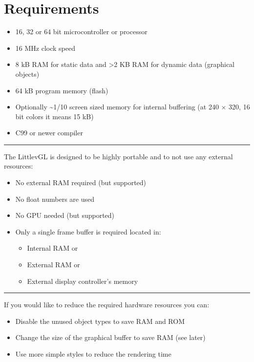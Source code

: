 \documentclass[letterpaper,10pt,english]{sphinxmanual}
\begin{document}
\section{Requirements}
\label{\detokenize{intro:requirements}}\begin{itemize}
\item {} 
16, 32 or 64 bit microcontroller or processor

\item {} 
16 MHz clock speed

\item {} 
8 kB RAM for static data and \textgreater{}2 KB RAM for dynamic data (graphical objects)

\item {} 
64 kB program memory (flash)

\item {} 
Optionally \textasciitilde{}1/10 screen sized memory for internal buffering (at 240 × 320, 16 bit colors it means 15 kB)

\item {} 
C99 or newer compiler

\end{itemize}


\bigskip\hrule\bigskip


The LittlevGL is designed to be highly portable and to not use any external resources:
\begin{itemize}
\item {} 
No external RAM required (but supported)

\item {} 
No float numbers are used

\item {} 
No GPU needed (but supported)

\item {} 
Only a single frame buffer is required located in:
\begin{itemize}
\item {} 
Internal RAM or

\item {} 
External RAM or

\item {} 
External display controller’s memory

\end{itemize}

\end{itemize}


\bigskip\hrule\bigskip


If you would like to reduce the required hardware resources you can:
\begin{itemize}
\item {} 
Disable the unused object types to save RAM and ROM

\item {} 
Change the size of the graphical buffer to save RAM (see later)

\item {} 
Use more simple styles to reduce the rendering time

\end{itemize}
\end{document}
